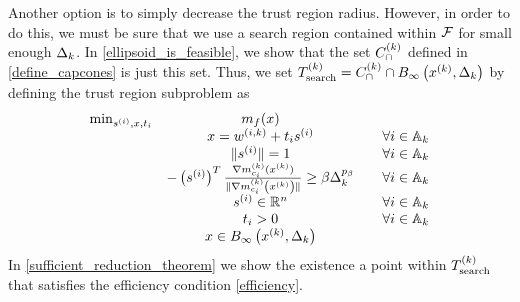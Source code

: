 Another option is to simply decrease the trust region radius.
However, in order to do this, we must be sure that we use a search region contained within ${\mathcal F}$ for small enough $\Delta_k$.
In \cref{ellipsoid_is_feasible}, we show that the set ${C^{(k)}_{\cap}}$ defined in \cref{define_capcones} is just this set.
Thus, we set $ {T_{\text{search}}^{(k)}} = {C^{(k)}_{\cap}} \cap { B_{\infty}\left(x^{(k)}, \Delta_k\right) }$ by defining the trust region subproblem as
\begin{align}
\label{capcones_tr_subproblem}
\begin{array}{ccc}
\min_{s^{(i)},x,t_i} & m_f(x) & \\
 & x = {w^{(i, k)}} + t _i s^{(i)} & \quad \forall i \in {\mathbb A_{k}} \\
 & \|s^{(i)}\| = 1 & \quad \forall i \in {\mathbb A_{k}} \\
 & -\left(s^{(i)}\right)^T{\frac{\nabla m^{(k)}_{c_i}(x^{(k)})}{\|\nabla m^{(k)}_{c_i}\left(x^{(k)}\right)\|}} \ge \beta \Delta_k^{p_{\beta}} & \quad \forall i \in {\mathbb A_{k}} \\
 & s^{(i)} \in \mathbb R^n  & \quad \forall i \in {\mathbb A_{k}} \\
 & t_i > 0          & \quad \forall i \in {\mathbb A_{k}} \\
 & x \in { B_{\infty}\left(x^{(k)}, \Delta_k\right) }		& \\
\end{array}
\end{align}
In \cref{sufficient_reduction_theorem} we show the existence a point within $ {T_{\text{search}}^{(k)}} $ that satisfies the efficiency condition \cref{efficiency}.



% 
% 
% 
% 
% 
% 



